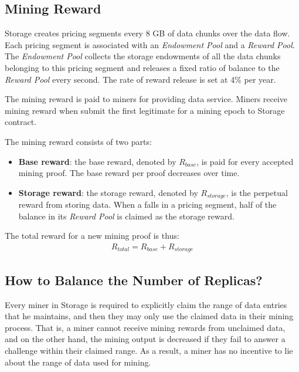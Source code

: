 

\subsection{Mining Reward}
\label{subsec:mining reward}

\projabbrev Storage creates pricing segments every 8 GB of data chunks over the data flow. 
%
Each pricing segment is associated with an \emph{Endowment Pool} and a \emph{Reward Pool}. 
%
The \emph{Endowment Pool} collects the storage endowments of all the data chunks belonging to this pricing segment and releases a fixed ratio of balance to the \emph{Reward Pool} every second. 
%
The rate of reward release is set at 4\% per year. 


The mining reward is paid to miners for providing data service.
Miners receive mining reward when submit the first legitimate {\sproof} for a mining epoch to \projabbrev Storage contract.

The mining reward consists of two parts:
\begin{itemize}
	\item {\bf Base reward}: the base reward, denoted by $R_{base}$, is paid for every accepted mining proof. The base reward per proof decreases over time.

	\item {\bf Storage reward}:  the storage reward, denoted by $R_{storage}$, is the perpetual reward from storing data. 
	When a {\sproof} falls in a pricing segment, half of the balance in its \emph{Reward Pool} is claimed as the storage reward. 

\end{itemize}

The total reward for a new mining proof is thus:
\begin{align}
	R_{total} = R_{base} + R_{storage}
\end{align}


\subsection{How to Balance the Number of Replicas?}

Every miner in \projabbrev Storage is required to explicitly claim the range of data entries that he maintains, 
and then they may only use the claimed data in their mining process.
That is, a miner cannot receive mining rewards from unclaimed data, and on the other hand, the mining output is decreased if they fail to answer a challenge within their claimed range.
As a result, a miner has no incentive to lie about the range of data used for mining.

